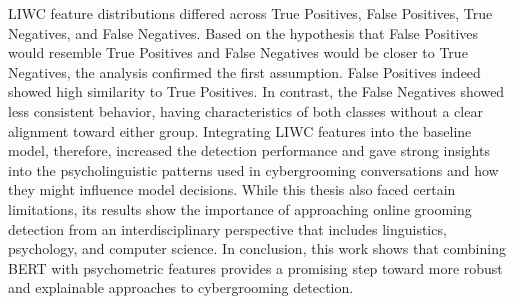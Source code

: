 LIWC feature distributions differed across True Positives, False Positives, True Negatives, and False Negatives. Based on the hypothesis that False Positives would resemble True Positives and False Negatives would be closer to True Negatives, the analysis confirmed the first assumption. False Positives indeed showed high similarity to True Positives. In contrast, the False Negatives showed less consistent behavior, having characteristics of both classes without a clear alignment toward either group. Integrating LIWC features into the baseline model, therefore, increased the detection performance and gave strong insights into the psycholinguistic patterns used in cybergrooming conversations and how they might influence model decisions. While this thesis also faced certain limitations, its results show the importance of approaching online grooming detection from an interdisciplinary perspective that includes linguistics, psychology, and computer science. In conclusion, this work shows that combining BERT with psychometric features provides a promising step toward more robust and explainable approaches to cybergrooming detection.